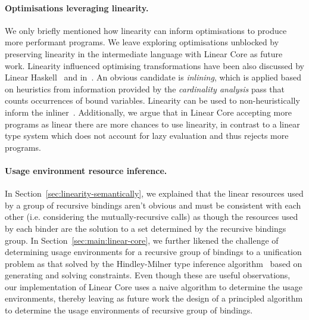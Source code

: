 \documentclass[acmsmall,review]{acmart}
\begin{document}


\paragraph{Optimisations leveraging linearity.}
We only briefly mentioned how linearity can inform optimisations to produce
more performant programs. We leave exploring optimisations unblocked by
preserving linearity in the intermediate language with Linear Core as future
work. Linearity influenced optimising transformations have been also discussed
by Linear Haskell~\cite{cite:linearhaskell} and
in~\cite{cite:let-floating,peytonjones1997a}. An obvious candidate is
\emph{inlining}, which is applied based on heuristics from information provided
by the \emph{cardinality analysis} pass that counts occurrences of bound
variables.  Linearity can be used to non-heuristically inform
the inliner~\cite{cite:linearhaskell}. Additionally, we argue that in Linear
Core accepting more programs as linear there are more chances to use linearity,
in contrast to a linear type system which does not account for lazy evaluation
and thus rejects more programs.

\paragraph{Usage environment resource inference.}
In Section~\ref{sec:linearity-semantically}, we explained that the linear
resources used by a group of recursive bindings aren't obvious and must be
consistent with each other (i.e. considering the mutually-recursive calls) as
though the resources used by each binder are the solution to a set determined
by the recursive bindings group.  In Section~\ref{sec:main:linear-core}, we
further likened the challenge of determining usage environments for a recursive
group of bindings to a unification problem as that solved by the Hindley-Milner
type inference algorithm~\cite{DBLP:conf/popl/DamasM82} based on generating and solving
constraints. Even though these are useful observations, our implementation of
Linear Core uses a naive algorithm to determine the usage environments, thereby
leaving as future work the design of a principled algorithm to determine the
usage environments of recursive group of bindings.
\end{document}
